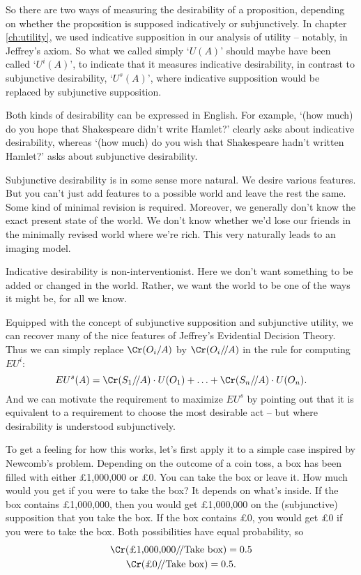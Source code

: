 {  So there are two ways of measuring the desirability of a
  proposition, depending on whether the proposition is supposed
  indicatively or subjunctively. In chapter \ref{ch:utility}, we used
  indicative supposition in our analysis of utility -- notably, in
  Jeffrey's axiom. So what we called simply `$U(A)$' should maybe have
  been called `$U^i(A)$', to indicate that it measures indicative
  desirability, in contrast to subjunctive desirability, `$U^s(A)$',
  where indicative supposition would be replaced by subjunctive
  supposition.

  Both kinds of desirability can be expressed in English. For example,
  `(how much) do you hope that Shakespeare didn't write Hamlet?'
  clearly asks about indicative desirability, whereas `(how much) do
  you wish that Shakespeare hadn't written Hamlet?' asks about
  subjunctive desirability.

  Subjunctive desirability is in some sense more natural. We desire
  various features. But you can't just add features to a possible
  world and leave the rest the same. Some kind of minimal revision is
  required. Moreover, we generally don't know the exact present state
  of the world. We don't know whether we'd lose our friends in the
  minimally revised world where we're rich. This very naturally leads
  to an imaging model.

  Indicative desirability is non-interventionist. Here we don't want
  something to be added or changed in the world. Rather, we want the
  world to be one of the ways it might be, for all we know.

  Equipped with the concept of subjunctive supposition and subjunctive
  utility, we can recover many of the nice features of Jeffrey's
  Evidential Decision Theory. Thus we can simply replace $\Cr(O_i/A)$
  by $\Cr(O_i/\!/A)$ in the rule for computing $EU^i$:
  \[
  EU^s(A) = \Cr(S_1/\!/A) \cdot U(O_1) + \ldots + \Cr(S_n/\!/A) \cdot U(O_n).
  \]
  And we can motivate the requirement to maximize $EU^s$ by pointing out
  that it is equivalent to a requirement to choose the most desirable
  act -- but where desirability is understood subjunctively.
} %

To get a feeling for how this works, let's first apply it to a simple
case inspired by Newcomb's problem. Depending on the outcome of a coin
toss, a box has been filled with either £1,000,000 or £0. You can take
the box or leave it. How much would you get if you were to take the
box? It depends on what's inside. If the box contains £1,000,000, then
you would get £1,000,000 on the (subjunctive) supposition that you
take the box. If the box contains £0, you would get £0 if you were to
take the box. Both possibilities have equal probability, so
\begin{gather*}
  \Cr(\text{£1,000,000}/\!/\text{Take box}) = 0.5\\
  \Cr(\text{£0}/\!/\text{Take box}) = 0.5.
\end{gather*}

